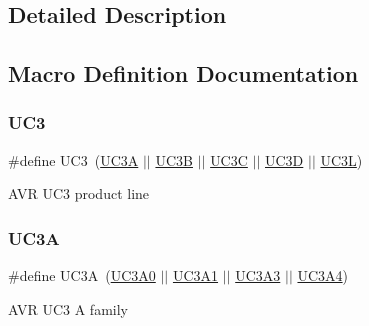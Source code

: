 \subsection{Detailed Description}


\subsection{Macro Definition Documentation}
\mbox{\label{group__uc3__part__macros__group_ga848d950beec67bc702bfcfdecc70bb5b}} 
\subsubsection{\texorpdfstring{UC3}{UC3}}
{\footnotesize\ttfamily \#define U\+C3~(\mbox{\hyperlink{group__uc3__part__macros__group_gaf7f16cc2bde7daf34576983fee8824c8}{U\+C3A}} $\vert$$\vert$ \mbox{\hyperlink{group__uc3__part__macros__group_ga61e51606324c212eb11079e5acf592e0}{U\+C3B}} $\vert$$\vert$ \mbox{\hyperlink{group__uc3__part__macros__group_gac7a13b9ceb67804d94b6a8967512ee71}{U\+C3C}} $\vert$$\vert$ \mbox{\hyperlink{group__uc3__part__macros__group_ga351a876f40669641e6ba9620909143d3}{U\+C3D}} $\vert$$\vert$ \mbox{\hyperlink{group__uc3__part__macros__group_gac8a7d715e500aa74cd05e0f0fc5bb005}{U\+C3L}})}

A\+VR U\+C3 product line \mbox{\label{group__uc3__part__macros__group_gaf7f16cc2bde7daf34576983fee8824c8}} 
\subsubsection{\texorpdfstring{UC3A}{UC3A}}
{\footnotesize\ttfamily \#define U\+C3A~(\mbox{\hyperlink{group__uc3__part__macros__group_gaee4dd9ce50cc26707d159660db9fc408}{U\+C3\+A0}} $\vert$$\vert$ \mbox{\hyperlink{group__uc3__part__macros__group_gacbe47eb7ac7d6e655d45657bffab3af6}{U\+C3\+A1}} $\vert$$\vert$ \mbox{\hyperlink{group__uc3__part__macros__group_gae08aa32db9bd4a60a8cfa222f7ff74cc}{U\+C3\+A3}} $\vert$$\vert$ \mbox{\hyperlink{group__uc3__part__macros__group_ga633294c4776386c15ab2050644e77b4f}{U\+C3\+A4}})}

A\+VR U\+C3 A family \mbox{\label{group__uc3__part__macros__group_gaee4dd9ce50cc26707d159660db9fc408}} 
